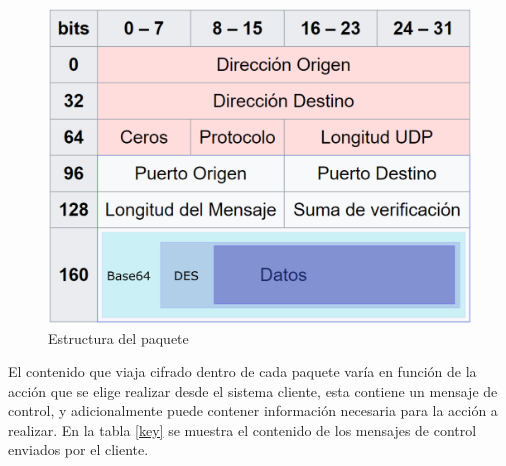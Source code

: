\documentclass[12pt]{article}
\begin{document}
            \begin{figure}[h!]
            \centering
                \includegraphics[scale=0.4]{ip_packet.eps}
                \caption{Estructura del paquete}
                \label{fig:ip_packet}
            \end{figure}

            El contenido que viaja cifrado dentro de cada paquete varía en función de la acción que se elige realizar desde el sistema cliente, esta contiene un mensaje de control, y adicionalmente puede contener información necesaria para la acción a realizar. En la tabla \ref{key}  se muestra el contenido de los mensajes de control enviados por el cliente.
\end{document}
